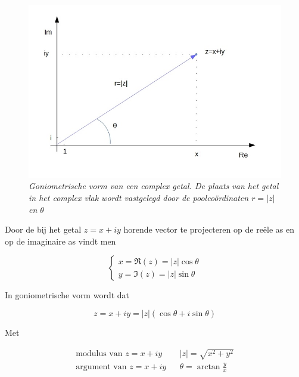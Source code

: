 \begin{figure}[h]
	\begin{center}
		\includegraphics[scale=0.6]{3_gonio_complexe_getallen/inputs/complex-getal-5-goniometrisch.jpg}
	\end{center}
	\caption{\it Goniometrische vorm van een complex getal. De plaats van het getal in het complex vlak wordt vastgelegd door de poolco\"{o}rdinaten $r=|z|$ en $\theta$}
\end{figure}

Door de bij het getal $z=x+iy$ horende vector te projecteren op de re\"{e}le as en op de imaginaire as vindt men

\[ \left\{ \begin{array}{l}
x=\Re(z)=|z|\cos \theta  \\ y=\Im(z)=|z|\sin \theta
\end{array} \right. \]

\begin{eigenschap}
	In goniometrische vorm wordt dat

\begin{framed}
\[ z=x+iy=|z|(\cos \theta + i \sin \theta)   \]
\end{framed}
Met 

\begin{framed}
	\[ \begin{array}{lll}
	\text{modulus van } z=x+iy & & |z|=\sqrt{x^2 +y^2} \\
	\text{argument van } z=x+iy & & \theta = \arctan \frac{y}{x}
	\end{array} \]
\end{framed}

\end{eigenschap}


